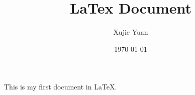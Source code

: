 \documentclass{article}
\title{LaTex Document}
\author{Xujie Yuan}
\date{\today}
\begin{document}
    \maketitle
    This is my first document in LaTeX.
\end{document}
